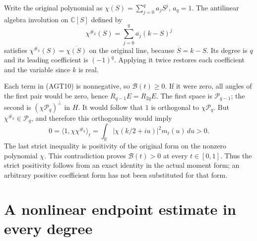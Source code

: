 \documentclass[11pt]{article}
\newcommand{\C}{\mathbb C}
\newcommand{\cP}{\mathcal P}
\begin{document}
Write the original polynomial as $\chi(S)=\sum_{j=0}^qa_jS^j$,
$a_q=1$. The antilinear algebra involution on $\C[S]$ defined by
\[
 \chi^{\#_k}(S)=\sum_{j=0}^q\overline{a_j}(k-S)^j
 \tag{AGT12}
\]
satisfies $\chi^{\#_k}(S)=\overline{\chi(S)}$ on the original
line, because $\overline S=k-S$. Its degree is $q$ and its
leading coefficient is $(-1)^q$. Applying it twice restores
each coefficient and the variable since $k$ is real.

Each term in (AGT10) is nonnegative, so $\mathcal B(t)\ge0$.
If it were zero, all angles of the first pair would be zero,
hence $R_{q-1}E=R_{2q}E$. The first space is $\cP_{q-1}$;
the second is $(\chi\cP_q)^\perp$ in $H$.
It would follow that $1$ is orthogonal to $\chi\cP_q$.
But $\chi^{\#_k}\in\cP_q$, and therefore this orthogonality
would imply
\[
 0=\langle1,\chi\chi^{\#_k}\rangle_t
   =\int_{\mathbb R}|\chi(k/2+iu)|^2m_t(u)\,du>0.
 \tag{AGT13}
\]
The last strict inequality is positivity of the original form
on the nonzero polynomial $\chi$. This contradiction proves
$\mathcal B(t)>0$ at every $t\in[0,1]$. Thus the strict
positivity follows from an exact identity in the actual
moment form; an arbitrary positive coefficient form has not
been substituted for that form.

\section{A nonlinear endpoint estimate in every degree}
\end{document}
